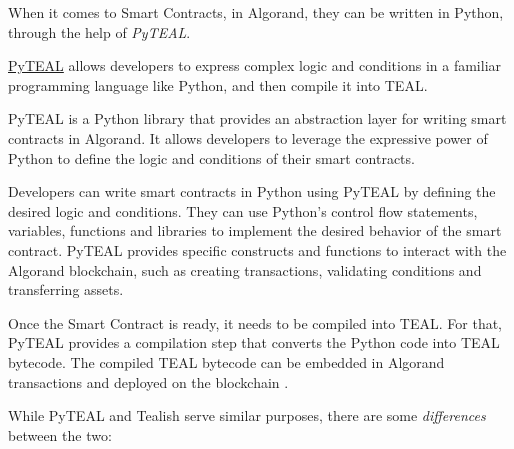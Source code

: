 When it comes to Smart Contracts, in Algorand, they can be written in Python, through the help of \textit{PyTEAL}.\newline

\href{https://github.com/algorand/pyteal}{PyTEAL} allows developers to express complex logic and conditions in a familiar programming language like Python, and then compile it into TEAL.\newline

PyTEAL is a Python library that provides an abstraction layer for writing smart contracts in Algorand. It allows developers to leverage the expressive power of Python to define the logic and conditions of their smart contracts.\newline

Developers can write smart contracts in Python using PyTEAL by defining the desired logic and conditions. They can use Python's control flow statements, variables, functions and libraries to implement the desired behavior of the smart contract.
PyTEAL provides specific constructs and functions to interact with the Algorand blockchain, such as creating transactions, validating conditions and transferring assets.\newline

Once the Smart Contract is ready, it needs to be compiled into TEAL. For that, PyTEAL provides a compilation step that converts the Python code into TEAL bytecode.
The compiled TEAL bytecode can be embedded in Algorand transactions and deployed on the blockchain \cite{pyteal}.\newline

While PyTEAL and Tealish serve similar purposes, there are some \textit{differences} between the two:

